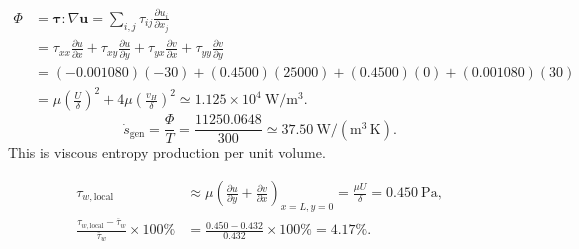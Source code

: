 \begin{align*}
\Phi&=\boldsymbol\tau:\nabla\mathbf u
 =\sum_{i,j}\tau_{ij}\frac{\partial u_i}{\partial x_j}\\
&=\tau_{xx}\frac{\partial u}{\partial x}
 +\tau_{xy}\frac{\partial u}{\partial y}
 +\tau_{yx}\frac{\partial v}{\partial x}
 +\tau_{yy}\frac{\partial v}{\partial y}\\
&=(-0.001080)(-30)+(0.4500)(25000)
 +(0.4500)(0)+(0.001080)(30)\\
&=\mu\left(\frac{U}{\delta}\right)^2
 +4\mu\left(\frac{v_H}{\delta}\right)^2
 \simeq\boxed{1.125\times10^4~\mathrm{W/m^3}}.
\end{align*}
\[
\boxed{\dot s_{\mathrm{gen}}=\frac{\Phi}{T}
=\frac{11250.0648}{300}
\simeq37.50~\mathrm{W/(m^3\,K)}}.
\]
This is viscous entropy production per unit volume.

\begin{align*}
\tau_{w,\mathrm{local}}
&\approx\mu\left(\frac{\partial u}{\partial y}
 +\frac{\partial v}{\partial x}\right)_{x=L,y=0}
 =\frac{\mu U}{\delta}
 =\boxed{0.450~\mathrm{Pa}},\\
\frac{\tau_{w,\mathrm{local}}-\overline\tau_w}{\overline\tau_w}\times100\%
&=\frac{0.450-0.432}{0.432}\times100\%
 =\boxed{4.17\%}.
\end{align*}

